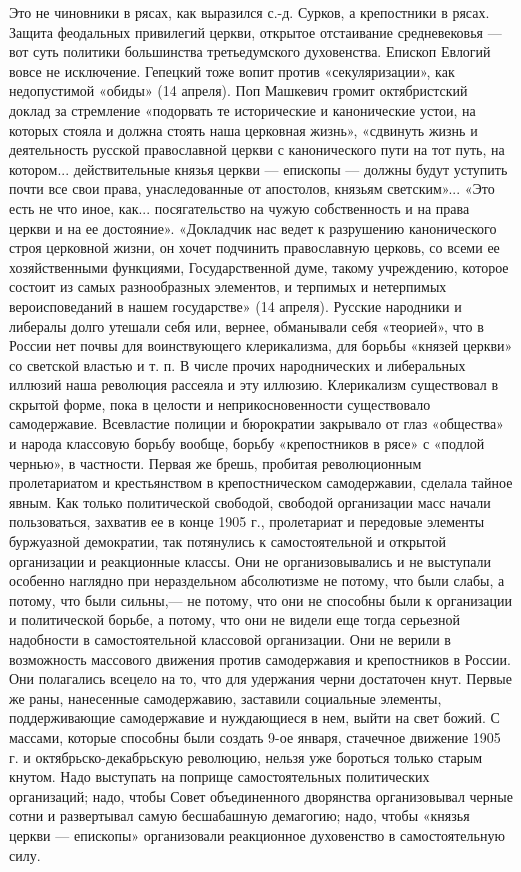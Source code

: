 \documentclass[12pt]{article}
\newcommand{\parnum}{(\arabic{parcount})}
\newcounter{parcount}
\newenvironment{parnumbers}{%
  \par%
  \everypar{\noindent \stepcounter{parcount}\marginpar[]{\parnum}}%
}{}
\begin{document}
\begin{parnumbers}
Это не чиновники в рясах, как выразился с.-д. Сурков, а крепостники в рясах. Защита феодальных привилегий церкви, открытое отстаивание средневековья — вот суть политики большинства третьедумского духовенства. Епископ Евлогий вовсе не исключение. Гепецкий тоже вопит против «секуляризации», как недопустимой «обиды» (14 апреля). Поп Машкевич громит октябристский доклад за стремление «подорвать те исторические и канонические устои, на которых стояла и должна стоять наша церковная жизнь», «сдвинуть жизнь и деятельность русской православной церкви с канонического пути на тот путь, на котором... действительные князья церкви — епископы — должны будут уступить почти все свои права, унаследованные от апостолов, князьям светским»... «Это есть не что иное, как... посягательство на чужую собственность и на права церкви и на ее достояние». «Докладчик нас ведет к разрушению канонического строя церковной жизни, он хочет подчинить православную церковь, со всеми ее хозяйственными функциями, Государственной думе, такому учреждению, которое состоит из самых разнообразных элементов, и терпимых и нетерпимых вероисповеданий в нашем государстве» (14 апреля). Русские народники и либералы долго утешали себя или, вернее, обманывали себя «теорией», что в России нет почвы для воинствующего клерикализма, для борьбы «князей церкви» со светской властью и т. п. В числе прочих народнических и либеральных иллюзий наша революция рассеяла и эту иллюзию. Клерикализм существовал в скрытой форме, пока в целости и неприкосновенности существовало самодержавие. Всевластие полиции и бюрократии закрывало от глаз «общества» и народа классовую борьбу вообще, борьбу «крепостников в рясе» с «подлой чернью», в частности. Первая же брешь, пробитая революционным пролетариатом и крестьянством в крепостническом самодержавии, сделала тайное явным. Как только политической свободой, свободой организации масс начали пользоваться, захватив ее в конце 1905 г., пролетариат и передовые элементы буржуазной демократии, так потянулись к самостоятельной и открытой организации и реакционные классы. Они не организовывались и не выступали особенно наглядно при нераздельном абсолютизме не потому, что были слабы, а потому, что были сильны,— не потому, что они не способны были к организации и политической борьбе, а потому, что они не видели еще тогда серьезной надобности в самостоятельной классовой организации. Они не верили в возможность массового движения против самодержавия и крепостников в России. Они полагались всецело на то, что для удержания черни достаточен кнут. Первые же раны, нанесенные самодержавию, заставили социальные элементы, поддерживающие самодержавие и нуждающиеся в нем, выйти на свет божий. С массами, которые способны были создать 9-ое января, стачечное движение 1905 г. и октябрьско-декабрьскую революцию, нельзя уже бороться только старым кнутом. Надо выступать на поприще самостоятельных политических организаций; надо, чтобы Совет объединенного дворянства организовывал черные сотни и развертывал самую бесшабашную демагогию; надо, чтобы «князья церкви — епископы» организовали реакционное духовенство в самостоятельную силу.


\end{parnumbers}
\end{document}
